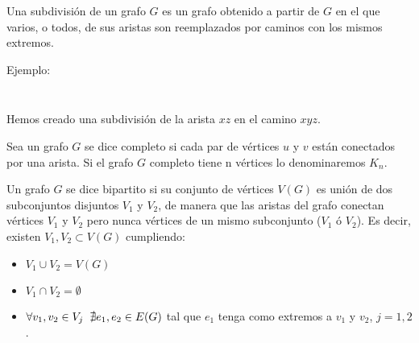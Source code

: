 \begin{definition}
	Una subdivisión de un grafo $G$ es un grafo obtenido a partir de $G$ en el que varios, o todos, de sus aristas son reemplazados por caminos con los mismos extremos.
\end{definition}

Ejemplo:

\[\]
\[\]

Hemos creado una subdivisión de la arista $xz$ en el camino $xyz$.
	
\begin{definition}
	Sea un grafo $G$ se dice completo si cada par de vértices $u$ y $v$ están conectados por una arista. Si el grafo $G$ completo tiene n vértices lo denominaremos $K_n$.
\end{definition}

\begin{definition}
	Un grafo $G$ se dice bipartito si su conjunto de vértices $V(G)$ es unión de dos subconjuntos disjuntos $V_1$ y $V_2$, de manera que las aristas del grafo conectan vértices $V_1$ y $V_2$ pero nunca    vértices de un mismo subconjunto ($V_1$ ó $V_2$). Es decir, existen $V_1,V_2 \subset V(G)$ cumpliendo:
	\begin{itemize}
		\item $V_1 \cup V_2 = V(G)$
		\item $V_1 \cap V_2 = \emptyset$
		\item $\forall v_{1},v_{2} \in V_j \hspace{0.1cm}  \hspace{0.1cm} \nexists e_{1},e_{2} \in E(G)$ tal que $e_{1}$ tenga como extremos a $v_{1}$ y $v_{2}$, $j=1,2$.
	\end{itemize}
\end{definition}

